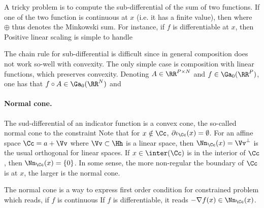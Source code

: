A tricky problem is to compute the sub-differential of the sum of two functions. If one of the two function is continuous at $x$ (i.e. it has a finite value), then 
where $\oplus$ thus denotes the Minkowski sum. For instance, if $f$ is differentiable at $x$, then 
Positive linear scaling is simple to handle

The chain rule for sub-differential is difficult since in general composition does not work so-well with convexity. 
%
The only simple case is composition with linear functions, which preserves convexity. Denoting $A \in \RR^{P \times N}$ and $f \in \Ga_0(\RR^P)$, one has that $f \circ A \in \Ga_0(\RR^N)$ and


\paragraph{Normal cone.}


The sud-differential of an indicator function is a convex cone, the so-called normal cone to the constraint
Note that for $x \notin \Cc$, $\partial  \iota_\Cc(x) = \emptyset$.
%
For an affine space $\Cc = a+\Vv$ where $\Vv \subset \Hh$ is a linear space, then $\Nn_\Cc(x)=\Vv^\bot$ is the usual orthogonal for linear spaces. If $x \in \inter(\Cc)$ is in the interior of $\Cc$, then $\Nn_\Cc(x)=\{0\}$. In some sense, the more non-regular the boundary of $\Cc$ is at $x$, the larger is the normal cone. 






The normal cone is a way to express first order condition for constrained problem
which reads, if $f$ is continuous
If $f$ is differentiable, it reads $-\nabla f(x) \in \Nn_\Cc(x)$.



